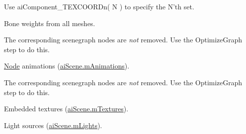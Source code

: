 \begin{Desc}
\begin{description}
Use ai\+Component\+\_\+\+T\+E\+X\+C\+O\+O\+R\+Dn( N ) to specify the N'th set. \item[{\em 
\hypertarget{namespaceassimp_1_1config_ad1b64b8f67159b86655b820ed6f75e62a04b79dc2b8de240eba72f2ec9b807284}{B\+O\+N\+E\+W\+E\+I\+G\+H\+T\+S}\label{namespaceassimp_1_1config_ad1b64b8f67159b86655b820ed6f75e62a04b79dc2b8de240eba72f2ec9b807284}
}]Bone weights from all meshes.

The corresponding scenegraph nodes are {\itshape not} removed. Use the {\ttfamily Optimize\+Graph} step to do this. \item[{\em 
\hypertarget{namespaceassimp_1_1config_ad1b64b8f67159b86655b820ed6f75e62a8c183d7b15080ebc8f9fba3fa68e8001}{A\+N\+I\+M\+A\+T\+I\+O\+N\+S}\label{namespaceassimp_1_1config_ad1b64b8f67159b86655b820ed6f75e62a8c183d7b15080ebc8f9fba3fa68e8001}
}]\hyperlink{struct_node}{Node} animations ({\ttfamily \hyperlink{structai_scene_ab76fb8f38c2e7365ccce42d565b62b25}{ai\+Scene.\+m\+Animations}}).

The corresponding scenegraph nodes are {\itshape not} removed. Use the {\ttfamily Optimize\+Graph} step to do this. \item[{\em 
\hypertarget{namespaceassimp_1_1config_ad1b64b8f67159b86655b820ed6f75e62a581dd6dae3ec70a700c8ad13518333a9}{T\+E\+X\+T\+U\+R\+E\+S}\label{namespaceassimp_1_1config_ad1b64b8f67159b86655b820ed6f75e62a581dd6dae3ec70a700c8ad13518333a9}
}]Embedded textures ({\ttfamily \hyperlink{structai_scene_a0fd0d29fbc439e3715b4975ccb68d2d3}{ai\+Scene.\+m\+Textures}}). \item[{\em 
\hypertarget{namespaceassimp_1_1config_ad1b64b8f67159b86655b820ed6f75e62a1e1c5a066e40e660862f6510dd6ca09f}{L\+I\+G\+H\+T\+S}\label{namespaceassimp_1_1config_ad1b64b8f67159b86655b820ed6f75e62a1e1c5a066e40e660862f6510dd6ca09f}
}]Light sources ({\ttfamily \hyperlink{structai_scene_a2e64a69ade81cae0b3901bea90b6bb47}{ai\+Scene.\+m\+Lights}}).


\end{description}
\end{Desc}
